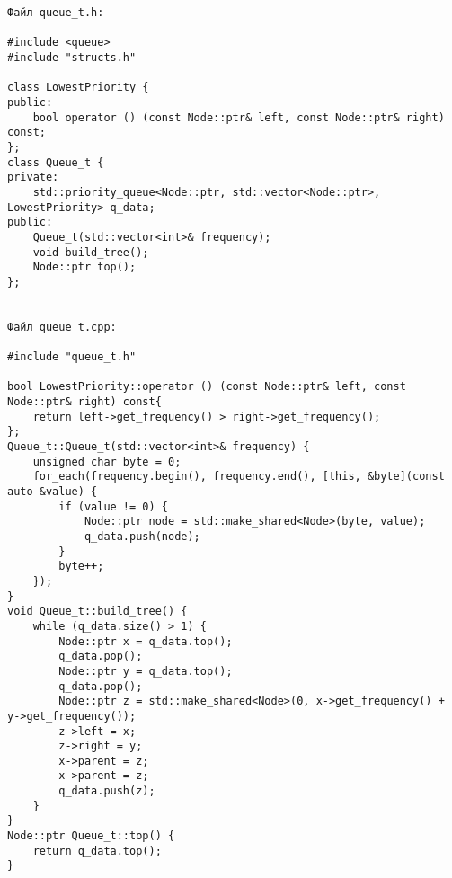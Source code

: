 \begin{verbatim}
Файл queue_t.h:

#include <queue>
#include "structs.h"

class LowestPriority {
public:
    bool operator () (const Node::ptr& left, const Node::ptr& right) const;
};
class Queue_t {
private:
    std::priority_queue<Node::ptr, std::vector<Node::ptr>, LowestPriority> q_data;
public:
    Queue_t(std::vector<int>& frequency);
    void build_tree();
    Node::ptr top();
};


Файл queue_t.cpp:

#include "queue_t.h"

bool LowestPriority::operator () (const Node::ptr& left, const Node::ptr& right) const{
    return left->get_frequency() > right->get_frequency();
};
Queue_t::Queue_t(std::vector<int>& frequency) {
    unsigned char byte = 0;
    for_each(frequency.begin(), frequency.end(), [this, &byte](const auto &value) {
        if (value != 0) {
            Node::ptr node = std::make_shared<Node>(byte, value);
            q_data.push(node);
        }
        byte++;
    });
}
void Queue_t::build_tree() {
    while (q_data.size() > 1) {
        Node::ptr x = q_data.top();
        q_data.pop();
        Node::ptr y = q_data.top();
        q_data.pop();
        Node::ptr z = std::make_shared<Node>(0, x->get_frequency() + y->get_frequency());
        z->left = x;
        z->right = y;
        x->parent = z;
        x->parent = z;
        q_data.push(z);
    }
}
Node::ptr Queue_t::top() {
    return q_data.top();
}
\end{verbatim}
